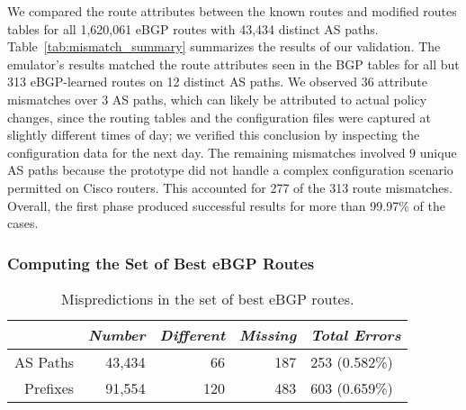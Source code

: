 We compared the route attributes between the {\mfc known routes} and
{\mfc modified routes} tables for all 1,620,061 eBGP routes
with 43,434 distinct AS paths.
Table~\ref{tab:mismatch_summary} summarizes the results of our
validation.  The emulator's results matched the route attributes seen in
the BGP tables for all but 313 eBGP-learned routes on 
12 distinct AS paths.  We observed 36 attribute mismatches over 3 AS
paths, which can likely be attributed to actual policy changes, since
the routing tables and the configuration files were captured at
slightly different times of day; we verified this conclusion by
inspecting the configuration data for the next day.  The remaining
mismatches involved 9 unique AS paths because the prototype did not
handle a complex configuration scenario permitted on Cisco routers.
This accounted for 277 of the 313 route mismatches.
Overall, the first phase produced successful results for more than
99.97\% of the cases. 


\subsubsection{Computing the Set of Best eBGP Routes}


\begin{table}
\begin{center}
{\small
\begin{tabular}{r|r|rr|l}
& {\em Number} & {\em Different} & {\em Missing} & {\em Total Errors}\\ \hline 
AS Paths & 43,434 & 66 & 187 & 253 (0.582\%) \\ %
Prefixes & 91,554 & 120 & 483 & 603 (0.659\%) \\ %
\end{tabular}
\vspace{-0.15in}
}
\end{center}
\caption{Mispredictions in the set of best eBGP routes.
} 
\label{tab:mismatch_summary_box2}
\end{table}

